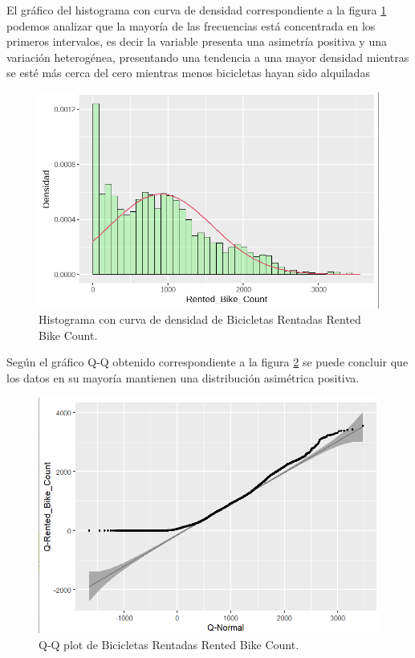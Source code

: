 \documentclass[]{elsarticle} %
\begin{document}
El gráfico del histograma con curva de densidad correspondiente a la
figura \ref{fig:fig3} podemos analizar que la mayoría de las frecuencias
está concentrada en los primeros intervalos, es decir la variable
presenta una asimetría positiva y una variación heterogénea, presentando
una tendencia a una mayor densidad mientras se esté más cerca del cero
mientras menos bicicletas hayan sido alquiladas

\begin{figure}[H]

{\centering \includegraphics[width=1\linewidth]{frec_density} 

}

\caption{\label{fig:fig3}Histograma con curva de densidad de Bicicletas Rentadas Rented Bike Count.}\label{fig:fig3}
\end{figure}
\newpage

Según el gráfico Q-Q obtenido correspondiente a la figura \ref{fig:fig4}
se puede concluir que los datos en su mayoría mantienen una distribución
asimétrica positiva.

\begin{figure}[H]

{\centering \includegraphics[width=1\linewidth]{qq} 

}

\caption{\label{fig:fig4}Q-Q plot de Bicicletas Rentadas Rented Bike Count.}\label{fig:fig4}
\end{figure}
\end{document}

